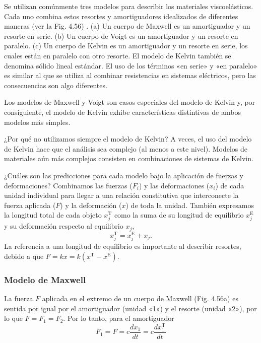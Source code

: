 \documentclass[12pt]{book}
\begin{document}
Se utilizan comúnmente tres modelos para describir los materiales viscoelásticos. Cada uno combina estos resortes y amortiguadores idealizados de diferentes maneras (ver la Fig. 4.56) \cite{22,27}. (a) Un cuerpo de Maxwell es un amortiguador y un resorte en serie. (b) Un cuerpo de Voigt es un amortiguador y un resorte en paralelo. (c) Un cuerpo de Kelvin es un amortiguador y un resorte en serie, los cuales están en paralelo con otro resorte. El modelo de Kelvin también se denomina sólido lineal estándar. El uso de los términos «en serie» y «en paralelo» es similar al que se utiliza al combinar resistencias en sistemas eléctricos, pero las consecuencias son algo diferentes.

Los modelos de Maxwell y Voigt son casos especiales del modelo de Kelvin y, por consiguiente, el modelo de Kelvin exhibe características distintivas de ambos modelos más simples.

¿Por qué no utilizamos siempre el modelo de Kelvin? A veces, el uso del modelo de Kelvin hace que el análisis sea complejo (al menos a este nivel). Modelos de materiales aún más complejos consisten en combinaciones de sistemas de Kelvin.

¿Cuáles son las predicciones para cada modelo bajo la aplicación de fuerzas y deformaciones? Combinamos las fuerzas ($F_i$) y las deformaciones ($x_i$) de cada unidad individual para llegar a una relación constitutiva que interconecte la fuerza aplicada ($F$) y la deformación ($x$) de toda la unidad. También expresamos la longitud total de cada objeto $x_j^{\text{T}}$ como la suma de su longitud de equilibrio $x_j^{\text{E}}$ y su deformación respecto al equilibrio $x_j$,
\[
x_j^{\text{T}} = x_j^{\text{E}} + x_j.
\]
La referencia a una longitud de equilibrio es importante al describir resortes, debido a que $F = kx = k(x^{\text{T}} - x^{\text{E}})$.

\subsubsection*{Modelo de Maxwell}

La fuerza $F$ aplicada en el extremo de un cuerpo de Maxwell (Fig. 4.56a) es sentida por igual por el amortiguador (unidad «1») y el resorte (unidad «2»), por lo que $F = F_1 = F_2$. Por lo tanto, para el amortiguador
\begin{equation}
F_1 = F = c \frac{dx_1}{dt} = c \frac{dx_1^{\text{T}}}{dt}
\label{eq:4.49}
\end{equation}
\end{document}
